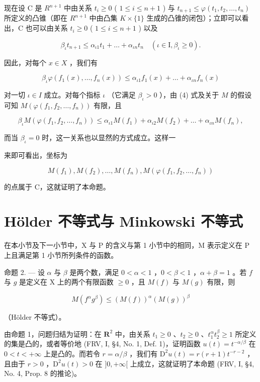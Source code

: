 现在设 C 是 \(R^{n+1}\) 中由关系 \(t_{i} \geqslant 0\) ( \(1 \leqslant i \leqslant n + 1\) ) 与 \(t_{n+1} \leqslant \varphi(t_{1}, t_{2}, \ldots, t_{n})\) 所定义的凸锥（即在 \(R^{n+1}\) 中由凸集 \(K \times \{1\}\) 生成的凸锥的闭包）；立即可以看出，C 也可以由关系 \(t_{i} \geqslant 0\) ( \(1 \leqslant i \leqslant n + 1\) ) 以及

\[
\beta_ {\iota} t _ {n + 1} \leqslant \alpha_ {\iota 1} t _ {1} + \dots + \alpha_ {\iota n} t _ {n} \quad (\iota \in \mathrm{I}, \beta_ {\iota} \geqslant 0).\tag{3}
\]

因此，对每个 \(x \in X\) ，我们有

\[
\beta_ {\iota} \varphi (f _ {1} (x), \dots , f _ {n} (x)) \leqslant \alpha_ {\iota 1} f _ {1} (x) + \dots + \alpha_ {\iota n} f _ {n} (x)\tag{4}
\]

对一切 \(\iota \in I\) 成立。对每个指标 \(\iota\) （它满足 \(\beta_{\iota} > 0\) ），由 (4) 式及关于 \(M\) 的假设可知 \(M(\varphi(f_1, f_2, \ldots, f_n))\) 有限，且

\[
\beta_ {\iota} M \left(\varphi \left(f _ {1}, f _ {2}, \dots , f _ {n}\right)\right) \leqslant \alpha_ {\iota 1} M \left(f _ {1}\right) + \alpha_ {\iota 2} M \left(f _ {2}\right) + \dots + \alpha_ {\iota n} M \left(f _ {n}\right),
\]

而当 \(\beta_{\iota} = 0\) 时，这一关系也以显然的方式成立。这样一

来即可看出，坐标为

\[
M (f _ {1}), M (f _ {2}), \dots , M (f _ {n}), M (\varphi (f _ {1}, f _ {2}, \dots , f _ {n}))
\]

的点属于 C，这就证明了本命题。

\section{Hölder 不等式与 Minkowski 不等式}

在本小节及下一小节中，X 与 P 的含义与第 1 小节中的相同，M 表示定义在 P 上且满足第 1 小节所列条件的函数。

命题 2. --- 设 \(\alpha\) 与 \(\beta\) 是两个数，满足 \(0 < \alpha < 1\) ，\(0 < \beta < 1\) ，\(\alpha + \beta = 1\) 。若 \(f\) 与 \(g\) 是定义在 X 上的两个有限函数 \(\geqslant 0\) ，且 \(M(f)\) 与 \(M(g)\) 有限，则

\[
M (f ^ {\alpha} g ^ {\beta}) \leqslant (M (f)) ^ {\alpha} (M (g)) ^ {\beta}\tag{5}
\]

（Hölder 不等式）。

由命题 1，问题归结为证明：在 \(\mathbf{R}^2\) 中，由关系 \(t_1 \geqslant 0\) 、\(t_2 \geqslant 0\) 、\(t_1^\alpha t_2^\beta \geqslant 1\) 所定义的集是凸的，或者等价地 (FRV, I, §4, No. 1, Def. 1)，证明函数 \(u(t) = t^{-\alpha/\beta}\) 在 \(0 < t < +\infty\) 上是凸的。而若令 \(r = \alpha/\beta\) ，我们有 \(\mathrm{D}^2 u(t) = r(r + 1)t^{-r - 2}\) ，且由于 \(r > 0\) ，\(\mathrm{D}^2 u(t) > 0\) 在 \(]0, +\infty[\) 上成立，这就证明了本命题 (FRV, I, §4, No. 4, Prop. 8 的推论)。

